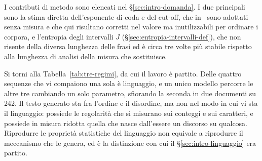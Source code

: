 I contributi di metodo sono elencati nel §\ref{sec:intro-domanda}. I due
principali sono la stima diretta
dell'esponente di coda e del cut-off, che in~\cite{altmann2012} sono adottati
senza misura e che qui risultano corretti nel valore ma inutilizzabili per
ordinare i corpora, e l'entropia degli intervalli $J$
(§\ref{sec:entropia-intervalli-def}), che non risente della diversa lunghezza
delle frasi ed è circa tre volte più stabile rispetto alla lunghezza di analisi
della misura che sostituisce.

Si torni alla Tabella~\ref{tab:tre-regimi}, da cui il lavoro è partito. Delle
quattro sequenze che vi compaiono una sola è linguaggio, e un unico modello
percorre le altre tre cambiando un solo parametro, sfiorando la seconda in due
documenti su \num{242}. Il testo generato sta fra l'ordine e il disordine, ma
non nel modo in cui vi sta il linguaggio: possiede le regolarità che si
misurano sui conteggi e sui caratteri, e possiede in misura ridotta quella che
nasce dall'essere un discorso su qualcosa. Riprodurre le proprietà statistiche
del linguaggio non equivale a riprodurre il meccanismo che le genera, ed è la
distinzione con cui il §\ref{sec:intro-linguaggio} era partito.
